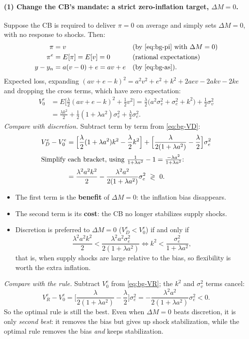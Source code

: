 \paragraph{(1) Change the CB's mandate: a strict zero-inflation target, $\Delta M=0$.}
Suppose the CB is required to deliver $\pi=0$ on average and simply sets $\Delta M=0$, with no response to shocks. Then:
\begin{align*}
\pi&=v &&\text{(by \eqref{eq:bg-pi} with $\Delta M=0$)}\\
\pi^e&=E[\pi]=E[v]=0 &&\text{(rational expectations)}\\
y-y_n&=a(v-0)+e=av+e &&\text{(by \eqref{eq:bg-as}).}
\end{align*}
Expected loss, expanding $(av+e-k)^2=a^2v^2+e^2+k^2+2aev-2akv-2ke$ and dropping the cross terms, which have zero expectation:
\begin{align*}
V_0^e&=E\Big[\frac{\lambda}{2}(av+e-k)^2+\frac12v^2\Big]
=\frac{\lambda}{2}\big(a^2\sigma_v^2+\sigma_e^2+k^2\big)+\frac12\sigma_v^2\\
&=\frac{\lambda k^2}{2}+\frac12(1+\lambda a^2)\sigma_v^2+\frac{\lambda}{2}\sigma_e^2 .
\end{align*}
\emph{Compare with discretion.} Subtract term by term from \eqref{eq:bg-VD}:
\begin{align*}
V_D^e-V_0^e&=\Big[\frac{\lambda}{2}(1+\lambda a^2)k^2-\frac{\lambda}{2}k^2\Big]+\Big[\frac{\lambda}{2(1+\lambda a^2)}-\frac{\lambda}{2}\Big]\sigma_e^2\\
\intertext{Simplify each bracket, using $\frac{1}{1+\lambda a^2}-1=\frac{-\lambda a^2}{1+\lambda a^2}$:}
&=\frac{\lambda^2a^2k^2}{2}-\frac{\lambda^2a^2}{2(1+\lambda a^2)}\sigma_e^2\ \gtrless\ 0 .
\end{align*}
\begin{itemize}
  \item The first term is the \textbf{benefit} of $\Delta M=0$: the inflation bias disappears.
  \item The second term is its \textbf{cost}: the CB no longer stabilizes supply shocks.
  \item Discretion is preferred to $\Delta M=0$ ($V_D^e<V_0^e$) if and only if
  \[
  \frac{\lambda^2a^2k^2}{2}<\frac{\lambda^2a^2\sigma_e^2}{2(1+\lambda a^2)}
  \iff k^2<\frac{\sigma_e^2}{1+\lambda a^2},
  \]
  that is, when supply shocks are large relative to the bias, so flexibility is worth the extra inflation.
\end{itemize}
\emph{Compare with the rule.} Subtract $V_0^e$ from \eqref{eq:bg-VR}; the $k^2$ and $\sigma_v^2$ terms cancel:
\[
V_R^e-V_0^e=\Big[\frac{\lambda}{2(1+\lambda a^2)}-\frac{\lambda}{2}\Big]\sigma_e^2=-\frac{\lambda^2a^2}{2(1+\lambda a^2)}\sigma_e^2<0 .
\]
So the optimal rule is still the best. Even when $\Delta M=0$ beats discretion, it is only \emph{second best}: it removes the bias but gives up shock stabilization, while the optimal rule removes the bias \emph{and} keeps stabilization.

